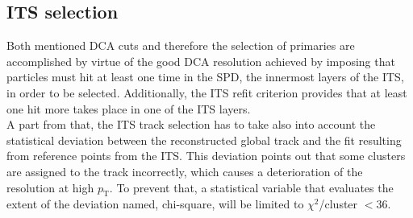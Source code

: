 \documentclass[12pt,a4paper]{report}
\begin{document}
\subsection{ITS selection}
Both mentioned DCA cuts and therefore the selection of primaries are accomplished by virtue of the good DCA resolution achieved by imposing that particles must hit at least one time in the SPD, the innermost layers of the ITS, in order to be selected. Additionally, the ITS refit criterion provides that at least one hit more takes place in one of the ITS layers. \\
A part from that, the ITS track selection has to take also into account the statistical deviation between the reconstructed global track and the fit resulting from reference points from the ITS. This deviation points out that some clusters are assigned to the track incorrectly, which causes a  deterioration of the \pt resolution at high $p_\text{T}$. To prevent that, a statistical variable that evaluates the extent of the deviation named, chi-square, will be limited to $\chi^2$/cluster $< 36$.
\end{document}
